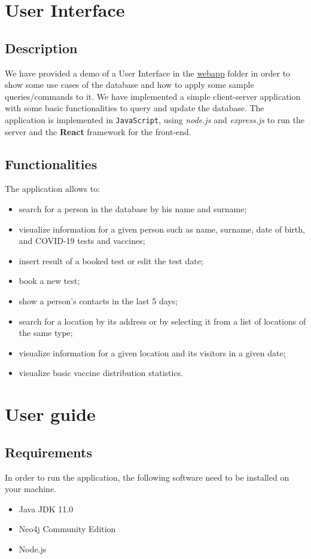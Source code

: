 \documentclass{article}
\begin{document}
\section{User Interface}
    \subsection{Description}
    We have provided a demo of a User Interface in the \href{https://github.com/filippolazzati/smbud/tree/main/graph\%20databases/webapp}{webapp} folder in order to show some use cases of the database and how to apply some sample queries/commands to it. We have implemented a simple client-server application with some basic functionalities to query and update the database. The application is implemented in \verb|JavaScript|, using \textit{node.js} and \textit{express.js} to run the server and the \textbf{React} framework for the front-end.
    \subsection{Functionalities}
    The application allows to:
    \begin{itemize}
    \item search for a person in the database by his name and surname;
    \item visualize information for a given person such as name, surname, date of birth, and COVID-19 tests and vaccines;
    \item insert result of a booked test or edit the test date;
    \item book a new test;
    \item show a person's contacts in the last 5 days;
    \item search for a location by its address or by selecting it from a list of locations of the same type;
    \item visualize information for a given location and its visitors in a given date;
    \item visualize basic vaccine distribution statistics.
    \end{itemize}
\section{User guide}
\subsection{Requirements}
In order to run the application, the following software need to be installed on your machine.
\begin{itemize}
    \item Java JDK 11.0
    \item Neo4j Community Edition
    \item Node.js
\end{itemize}
\end{document}
